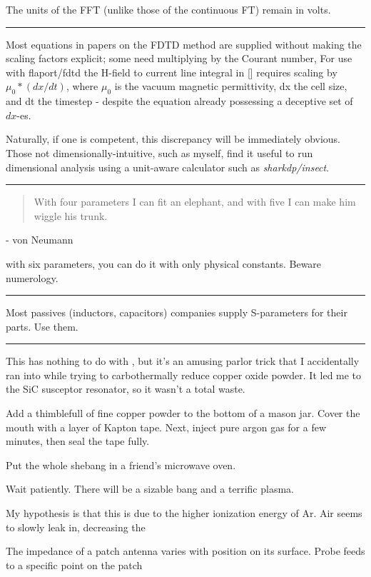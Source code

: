 \documentclass[paper.tex]{subfiles}
\begin{document}
The units of the FFT (unlike those of the continuous FT) remain in volts.

\rule{\linewidth}{0.2pt}

Most equations in papers on the FDTD method are supplied without making the scaling factors explicit; some need multiplying by the Courant number, For use with flaport/fdtd the H-field to current line integral in [] requires scaling by $\mu_0 * (dx/dt)$, where $\mu_0$ is the vacuum magnetic permittivity, dx the cell size, and dt the timestep - despite the equation already possessing a deceptive set of $dx$-es.

Naturally, if one is competent, this discrepancy will be immediately obvious. Those not dimensionally-intuitive, such as myself, find it useful to run dimensional analysis using a unit-aware calculator such as {\it sharkdp/insect}.

\rule{\linewidth}{0.2pt}



\begin{quote}
With four parameters I can fit an elephant, and with five I can make him wiggle his trunk.
\end{quote}
- von Neumann  

with six parameters, you can do it with only physical constants. Beware numerology.

\rule{\linewidth}{0.2pt}

Most passives (inductors, capacitors) companies supply S-parameters for their parts. Use them.

\rule{\linewidth}{0.2pt}

This has nothing to do with , but it's an amusing parlor trick that I accidentally ran into while trying to carbothermally reduce copper oxide powder. It led me to the SiC susceptor resonator, so it wasn't a total waste.

Add a thimblefull of fine copper powder to the bottom of a mason jar. Cover the mouth with a layer of Kapton tape. Next, inject pure argon gas for a few minutes, then seal the tape fully.

Put the whole shebang in a friend's microwave oven. 

Wait patiently. There will be a sizable bang and a terrific plasma.

My hypothesis is that this is due to the higher ionization energy of Ar. Air seems to slowly leak in, decreasing the 



The impedance of a patch antenna varies with position on its surface. Probe feeds to a specific point on the patch
\end{document}

